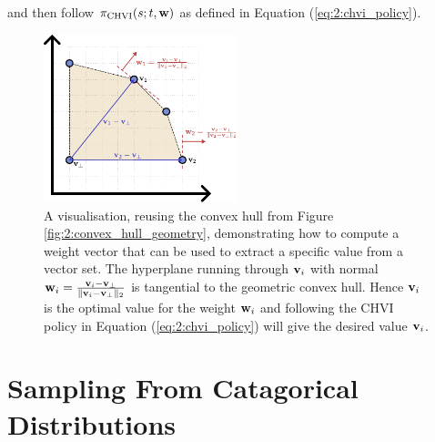         and then follow ${\pi_{{\textnormal{CHVI}}}}(s;t,\mathbf{w})$ as defined in Equation (\ref{eq:2:chvi_policy}).
        
        \begin{figure}
            \centering\includegraphics[width=0.5\textwidth]{figures/ch2/ch_extract_policy_weight.pdf} 
            \caption[A visualisation, reusing the convex hull from Figure \ref{fig:2:convex_hull_geometry}, demonstrating how to compute a weight vector that can be used to extract a specific value from a vector set.]{A visualisation, reusing the convex hull from Figure \ref{fig:2:convex_hull_geometry}, demonstrating how to compute a weight vector that can be used to extract a specific value from a vector set. The hyperplane running through $\mathbf{v}_i$ with normal $\mathbf{w}_i=\frac{\mathbf{v}_i-\mathbf{v}_\bot}{\Vert\mathbf{v}_i-\mathbf{v}_\bot\Vert_2}$ is tangential to the geometric convex hull. Hence $\mathbf{v}_i$ is the optimal value for the weight $\mathbf{w}_i$ and following the CHVI policy in Equation (\ref{eq:2:chvi_policy}) will give the desired value $\mathbf{v}_i$.}
            \label{fig:2:convex_hull_extract_policy_weight} 
        \end{figure}











\section{Sampling From Catagorical Distributions}
\label{sec:2-6-sampling}
    

